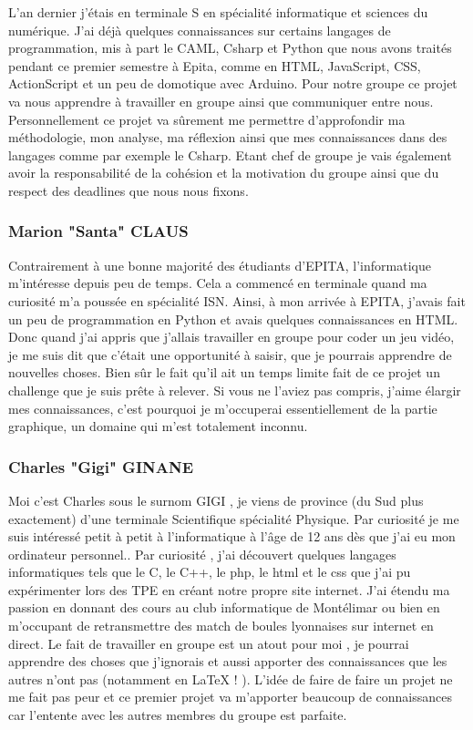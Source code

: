 \documentclass[a4paper]{article}
\begin{document}
L’an dernier j’étais en terminale S en spécialité informatique et sciences du numérique. J’ai déjà quelques connaissances sur certains langages de programmation, mis à part le CAML, Csharp et Python que nous avons traités pendant ce premier semestre à Epita, comme en HTML, JavaScript, CSS, ActionScript et un peu de domotique avec Arduino. Pour notre groupe ce projet va nous apprendre à travailler en groupe ainsi que communiquer entre nous. Personnellement ce projet va sûrement me permettre d'approfondir ma méthodologie, mon analyse, ma réflexion ainsi que mes connaissances dans des langages comme par exemple le Csharp. Etant chef de groupe je vais également avoir la responsabilité de la cohésion et la motivation du groupe ainsi que du respect des deadlines que nous nous fixons.



		\subsubsection{Marion "Santa" CLAUS}
			
Contrairement à une bonne majorité des étudiants d’EPITA, l’informatique m’intéresse depuis peu de temps. Cela a commencé en terminale quand ma curiosité m’a poussée en spécialité ISN. Ainsi, à mon arrivée à EPITA, j’avais fait un peu de programmation en Python et avais quelques connaissances en HTML. Donc quand j’ai appris que j’allais travailler en groupe pour coder un jeu vidéo, je me suis dit que c’était une opportunité à saisir, que je pourrais apprendre de nouvelles choses. Bien sûr le fait qu’il ait un temps limite fait de ce projet un challenge que je suis prête à relever. Si vous ne l'aviez pas compris, j’aime élargir mes connaissances, c’est pourquoi je m’occuperai essentiellement de la partie graphique, un domaine qui m’est totalement inconnu.

\newpage

		\subsubsection{Charles "Gigi" GINANE}
			

Moi c’est Charles sous le surnom GIGI , je viens de province (du Sud plus exactement) d’une terminale Scientifique spécialité Physique. Par curiosité je me suis intéressé petit à petit à l’informatique à l’âge de 12 ans dès que j’ai eu mon ordinateur personnel..
Par curiosité , j’ai découvert quelques langages informatiques tels que le C, le C++, le php, le html et le css que j’ai pu expérimenter lors des TPE en créant notre propre site internet.
J’ai étendu ma passion en donnant des cours au club informatique de Montélimar ou bien en m’occupant de retransmettre des match de boules lyonnaises sur internet en direct.
Le fait de travailler en groupe est un atout pour moi , je pourrai apprendre des choses que j’ignorais et aussi apporter des connaissances que les autres n’ont pas (notamment en LaTeX ! ).
L’idée de faire de faire un projet ne me fait pas peur et ce premier projet va m’apporter beaucoup de connaissances car l’entente avec les autres membres du groupe est parfaite.
\end{document}
